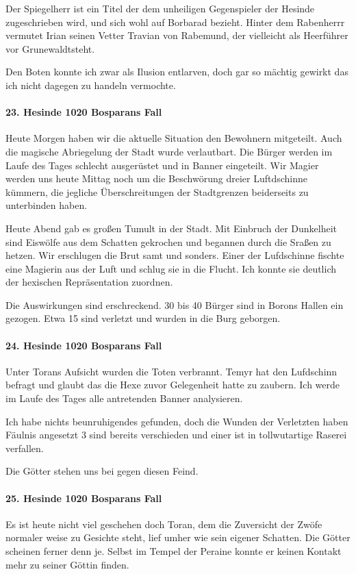 Der Spiegelherr ist ein Titel der dem unheiligen Gegenspieler der Hesinde zugeschrieben wird, und sich wohl auf Borbarad bezieht. Hinter dem Rabenherrr vermutet Irian seinen Vetter Travian von Rabemund, der vielleicht als Heerführer vor Grunewaldtsteht.

Den Boten konnte ich zwar als Ilusion entlarven, doch gar so mächtig gewirkt das ich nicht dagegen zu handeln vermochte.

\paragraph{23. Hesinde 1020 Bosparans Fall}
Heute Morgen haben wir die aktuelle Situation den Bewohnern mitgeteilt. Auch die magische Abriegelung der Stadt wurde verlautbart. Die Bürger werden im Laufe des Tages schlecht ausgerüstet und in Banner eingeteilt. Wir Magier werden uns heute Mittag noch um die Beschwörung dreier Luftdschinne kümmern, die jegliche Überschreitungen der Stadtgrenzen beiderseits zu unterbinden haben.

Heute Abend gab es großen Tumult in der Stadt. Mit Einbruch der Dunkelheit sind Eiswölfe aus dem Schatten gekrochen und begannen durch die Sraßen zu hetzen. Wir erschlugen die Brut samt und sonders. Einer der Lufdschinne fischte eine Magierin aus der Luft und schlug sie in die Flucht. Ich konnte sie deutlich der hexischen Repräsentation zuordnen.

Die Auswirkungen sind erschreckend. 30 bis 40 Bürger sind in Borons Hallen ein gezogen. Etwa 15 sind verletzt und wurden in die Burg geborgen.

\paragraph{24. Hesinde 1020 Bosparans Fall}
Unter Torans Aufsicht wurden die Toten verbrannt. Temyr hat den Lufdschinn befragt und glaubt das die Hexe zuvor Gelegenheit hatte zu zaubern. Ich werde im Laufe des Tages alle antretenden Banner analysieren.

Ich habe nichts beunruhigendes gefunden, doch die Wunden der Verletzten haben Fäulnis angesetzt 3 sind bereits verschieden und einer ist in tollwutartige Raserei verfallen.

Die Götter stehen uns bei gegen diesen Feind.

\paragraph{25. Hesinde 1020 Bosparans Fall}
Es ist heute nicht viel geschehen doch Toran, dem die Zuversicht der Zwöfe normaler weise zu Gesichte steht, lief umher wie sein eigener Schatten. Die Götter scheinen ferner denn je. Selbst im Tempel der Peraine konnte er keinen Kontakt mehr zu seiner Göttin finden.

